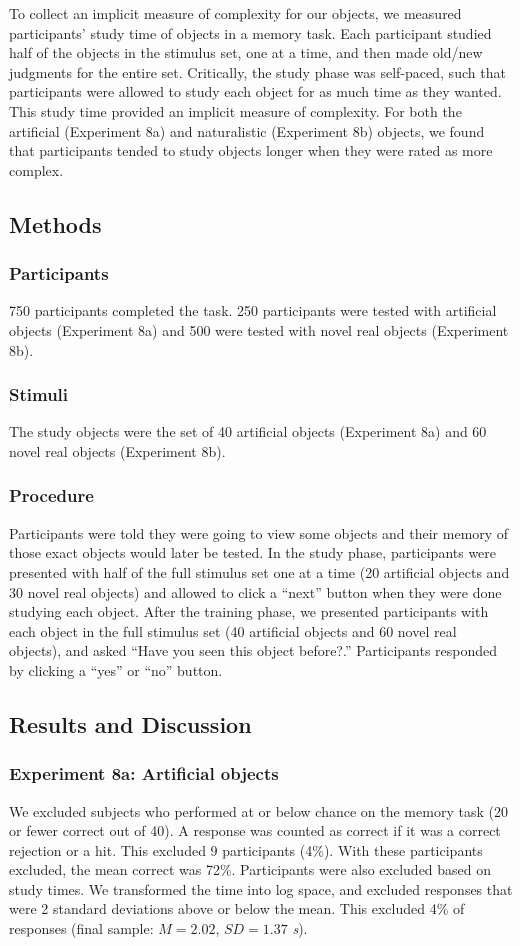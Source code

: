 To collect an implicit measure of complexity for our objects, we measured participants' study time of objects in a memory task. Each participant studied half of the objects in the stimulus set, one at a time, and then made old/new judgments for the entire set. Critically, the study phase was self-paced, such that participants were allowed to study each object for as much time as they wanted. This study time provided an implicit measure of complexity. For both the artificial (Experiment 8a) and naturalistic (Experiment 8b) objects, we found that participants tended to study objects longer when they were rated as more complex.

\subsection{Methods}
\subsubsection{Participants} 750 participants completed the task. 250 participants were tested with artificial objects (Experiment 8a) and 500 were tested with novel real objects (Experiment 8b).
\subsubsection{Stimuli} The study objects were the set of 40 artificial objects (Experiment 8a) and 60 novel real objects (Experiment 8b).

\subsubsection{Procedure} Participants were told they were going to view some objects and their memory of those exact objects would later be tested. In the study phase, participants were presented with half of the full stimulus set one at a time (20 artificial objects and 30 novel real objects) and allowed to click a ``next'' button when they were done studying each object. After the training phase, we presented participants with each object in the full stimulus set (40 artificial objects and 60 novel real objects), and asked ``Have you seen this object before?.'' Participants responded by clicking a ``yes'' or ``no'' button.

\subsection{Results and Discussion }
\subsubsection{Experiment 8a: Artificial objects}
We excluded subjects who performed at or below chance on the memory task (20 or fewer correct out of 40). A response was counted as correct if it was a correct rejection or a hit. This excluded 9 participants (4\%). With these participants excluded, the mean correct was 72\%. Participants were also excluded based on study times. We transformed the time into log space, and excluded responses that were 2 standard deviations above or below the mean. This excluded 4\% of responses (final sample: $M = 2.02$, $SD = 1.37$ {\it s}).

